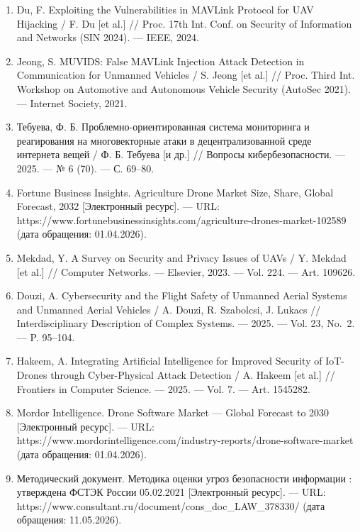 \begin{enumerate}
  Петренко, В. И. Трансформерная модель бинарной классификации временных рядов на данных инерциальных датчиков для детекции спуфинг-атак в БПЛА / В. И. Петренко {[}и др.{]} // International Journal of Open Information Technologies. --- 2026. --- Т. 14, № 2. --- С. 11--18.
\item
  Du, F. Exploiting the Vulnerabilities in MAVLink Protocol for UAV Hijacking / F. Du {[}et al.{]} // Proc. 17th Int. Conf. on Security of Information and Networks (SIN 2024). --- IEEE, 2024.
\item
  Jeong, S. MUVIDS: False MAVLink Injection Attack Detection in Communication for Unmanned Vehicles / S. Jeong {[}et al.{]} // Proc. Third Int. Workshop on Automotive and Autonomous Vehicle Security (AutoSec 2021). --- Internet Society, 2021.
\item
  Тебуева, Ф. Б. Проблемно-ориентированная система мониторинга и реагирования на многовекторные атаки в децентрализованной среде интернета вещей / Ф. Б. Тебуева {[}и др.{]} // Вопросы кибербезопасности. --- 2025. --- № 6 (70). --- С. 69--80.
\item
  Fortune Business Insights. Agriculture Drone Market Size, Share, Global Forecast, 2032 {[}Электронный ресурс{]}. --- URL: https://www.fortunebusinessinsights.com/agriculture-drones-market-102589 (дата обращения: 01.04.2026).
\item
  Mekdad, Y. A Survey on Security and Privacy Issues of UAVs / Y. Mekdad {[}et al.{]} // Computer Networks. --- Elsevier, 2023. --- Vol. 224. --- Art. 109626.
\item
  Douzi, A. Cybersecurity and the Flight Safety of Unmanned Aerial Systems and Unmanned Aerial Vehicles / A. Douzi, R. Szabolcsi, J. Lukacs // Interdisciplinary Description of Complex Systems. --- 2025. --- Vol. 23, No.~2. --- P. 95--104.
\item
  Hakeem, A. Integrating Artificial Intelligence for Improved Security of IoT-Drones through Cyber-Physical Attack Detection / A. Hakeem {[}et al.{]} // Frontiers in Computer Science. --- 2025. --- Vol. 7. --- Art. 1545282.
\item
  Mordor Intelligence. Drone Software Market --- Global Forecast to 2030 {[}Электронный ресурс{]}. --- URL: https://www.mordorintelligence.com/industry-reports/drone-software-market (дата обращения: 01.04.2026).
\item
  Методический документ. Методика оценки угроз безопасности информации : утверждена ФСТЭК России 05.02.2021 {[}Электронный ресурс{]}. --- URL: https://www.consultant.ru/document/cons_doc_LAW_378330/ (дата обращения: 11.05.2026).

\end{enumerate}
